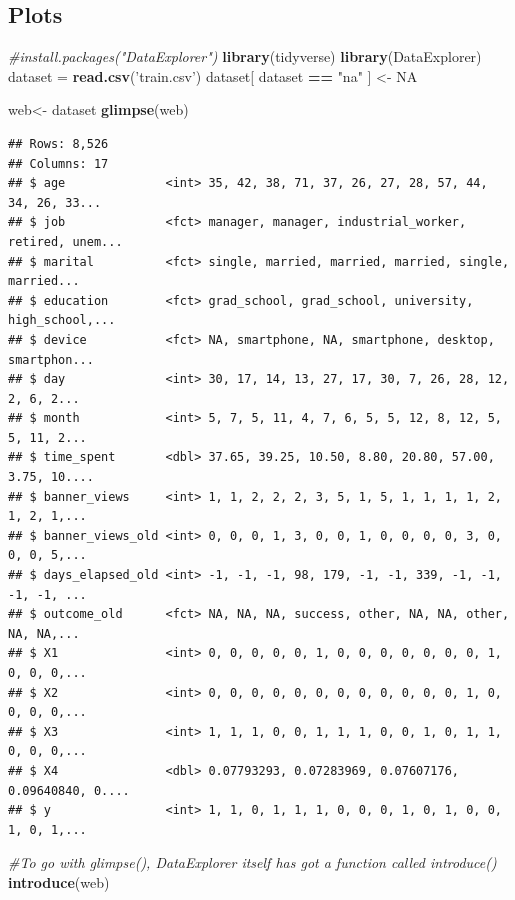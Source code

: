 \documentclass[
]{article}
\newenvironment{Shaded}{\begin{snugshade}}{\end{snugshade}}
\newcommand{\CommentTok}[1]{\textcolor[rgb]{0.56,0.35,0.01}{\textit{#1}}}
\newcommand{\KeywordTok}[1]{\textcolor[rgb]{0.13,0.29,0.53}{\textbf{#1}}}
\newcommand{\NormalTok}[1]{#1}
\newcommand{\OperatorTok}[1]{\textcolor[rgb]{0.81,0.36,0.00}{\textbf{#1}}}
\newcommand{\OtherTok}[1]{\textcolor[rgb]{0.56,0.35,0.01}{#1}}
\newcommand{\StringTok}[1]{\textcolor[rgb]{0.31,0.60,0.02}{#1}}
\begin{document}
\subsection{Plots}

\begin{Shaded}
\begin{Highlighting}[]
\CommentTok{#install.packages("DataExplorer")}
\KeywordTok{library}\NormalTok{(tidyverse)}
\KeywordTok{library}\NormalTok{(DataExplorer)}
\NormalTok{dataset =}\StringTok{ }\KeywordTok{read.csv}\NormalTok{(}\StringTok{'train.csv'}\NormalTok{)}
\NormalTok{dataset[ dataset }\OperatorTok{==}\StringTok{ "na"}\NormalTok{ ] <-}\StringTok{ }\OtherTok{NA}

\NormalTok{web<-}\StringTok{ }\NormalTok{dataset}
\KeywordTok{glimpse}\NormalTok{(web)}
\end{Highlighting}
\end{Shaded}

\begin{verbatim}
## Rows: 8,526
## Columns: 17
## $ age              <int> 35, 42, 38, 71, 37, 26, 27, 28, 57, 44, 34, 26, 33...
## $ job              <fct> manager, manager, industrial_worker, retired, unem...
## $ marital          <fct> single, married, married, married, single, married...
## $ education        <fct> grad_school, grad_school, university, high_school,...
## $ device           <fct> NA, smartphone, NA, smartphone, desktop, smartphon...
## $ day              <int> 30, 17, 14, 13, 27, 17, 30, 7, 26, 28, 12, 2, 6, 2...
## $ month            <int> 5, 7, 5, 11, 4, 7, 6, 5, 5, 12, 8, 12, 5, 5, 11, 2...
## $ time_spent       <dbl> 37.65, 39.25, 10.50, 8.80, 20.80, 57.00, 3.75, 10....
## $ banner_views     <int> 1, 1, 2, 2, 2, 3, 5, 1, 5, 1, 1, 1, 1, 2, 1, 2, 1,...
## $ banner_views_old <int> 0, 0, 0, 1, 3, 0, 0, 1, 0, 0, 0, 0, 3, 0, 0, 0, 5,...
## $ days_elapsed_old <int> -1, -1, -1, 98, 179, -1, -1, 339, -1, -1, -1, -1, ...
## $ outcome_old      <fct> NA, NA, NA, success, other, NA, NA, other, NA, NA,...
## $ X1               <int> 0, 0, 0, 0, 0, 1, 0, 0, 0, 0, 0, 0, 0, 1, 0, 0, 0,...
## $ X2               <int> 0, 0, 0, 0, 0, 0, 0, 0, 0, 0, 0, 0, 1, 0, 0, 0, 0,...
## $ X3               <int> 1, 1, 1, 0, 0, 1, 1, 1, 0, 0, 1, 0, 1, 1, 0, 0, 0,...
## $ X4               <dbl> 0.07793293, 0.07283969, 0.07607176, 0.09640840, 0....
## $ y                <int> 1, 1, 0, 1, 1, 1, 0, 0, 0, 1, 0, 1, 0, 0, 1, 0, 1,...
\end{verbatim}

\begin{Shaded}
\begin{Highlighting}[]
\CommentTok{#To go with glimpse(), DataExplorer itself has got a function called introduce()}
\KeywordTok{introduce}\NormalTok{(web)}
\end{Highlighting}
\end{Shaded}
\end{document}
